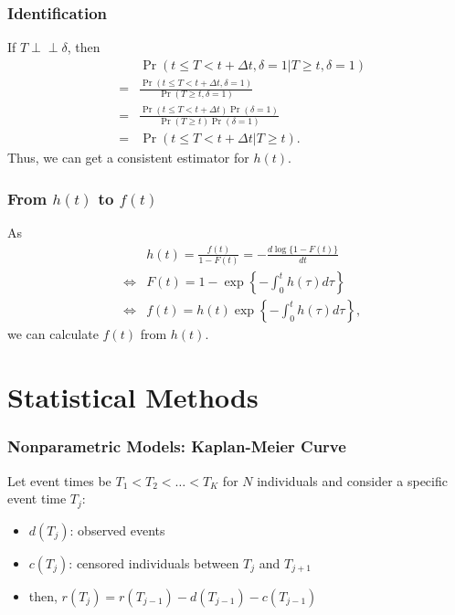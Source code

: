 \documentclass[14pt]{beamer}
\newcommand{\indep}{\perp \!\!\! \perp}
\begin{document}
	\begin{frame}
	\frametitle{Identification}
	If $T \indep \delta$, then
	\begin{eqnarray*}
	&\phantom{=}& \Pr(t \leq T < t + \Delta t, \delta = 1 | T \geq t, \delta = 1)\\
	&=& \frac{\Pr(t \leq T < t + \Delta t, \delta = 1)}{\Pr(T \geq t, \delta = 1)}\\
	&=& \frac{\Pr(t \leq T < t + \Delta t) \Pr(\delta = 1)}{\Pr(T \geq t) \Pr(\delta = 1)}\\
	&=& \Pr(t \leq T < t + \Delta t | T \geq t).
	\end{eqnarray*}
	Thus, we can get a consistent estimator for $h(t)$.

	\end{frame}

	\begin{frame}
	\frametitle{From $h(t)$ to $f(t)$}
	As
	\begin{eqnarray*}
	&\phantom{\Leftrightarrow}& h(t) = \frac{f(t)}{1-F(t)} = -\frac{d\log \{1-F(t)\}}{dt}\\
	&\Leftrightarrow& F(t) = 1-\exp \left\{-\int_0^t h(\tau) d\tau \right\}\\
	&\Leftrightarrow& f(t) = h(t) \exp \left\{-\int_0^t h(\tau) d\tau \right\},
	\end{eqnarray*}
	we can calculate $f(t)$ from $h(t)$.

	\end{frame}


	\section{Statistical Methods}

	\begin{frame}
	\frametitle{Nonparametric Models: Kaplan-Meier Curve}
	Let event times be $T_1 < T_2 < \dots < T_K$ for $N$ individuals and consider a specific event time $T_j$:
	\begin{itemize}
	\item $d(T_j)$: observed events
	\item $c(T_j)$: censored individuals between $T_{j}$ and $T_{j+1}$
	\item then, $r(T_j) = r(T_{j-1}) - d(T_{j-1}) - c(T_{j-1})$

	\end{itemize}

	\end{frame}
\end{document}
